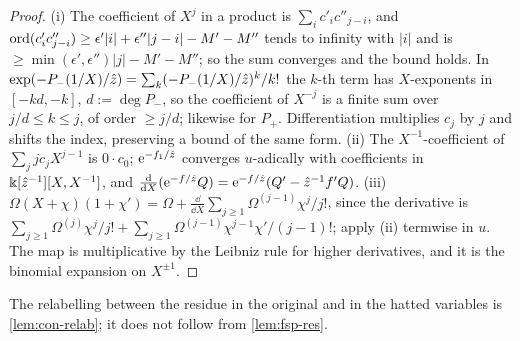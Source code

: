 \begin{proof}
(i) The coefficient of $X^j$ in a product is $\sum_ic'_ic''_{j-i}$, and $\operatorname{ord}(c'_ic''_{j-i})\geq\epsilon'|i|+\epsilon''|j-i|-M'-M''$ tends to infinity with $|i|$ and is $\geq\min(\epsilon',\epsilon'')|j|-M'-M''$; so the sum converges and the bound holds. In $\exp(-P_-(1/X)/\hat{z})=\sum_k(-P_-(1/X)/\hat{z})^k/k!$ the $k$-th term has $X$-exponents in $[-kd,-k]$, $d:=\deg P_-$, so the coefficient of $X^{-j}$ is a finite sum over $j/d\leq k\leq j$, of order $\geq j/d$; likewise for $P_+$. Differentiation multiplies $c_j$ by $j$ and shifts the index, preserving a bound of the same form. (ii) The $X^{-1}$-coefficient of $\sum_jjc_jX^{j-1}$ is $0\cdot c_0$; $\mathrm{e}^{-f_1/\hat{z}}$ converges $u$-adically with coefficients in $\Bbbk[\hat{z}^{-1}][X,X^{-1}]$, and $\frac{\mathrm{d}}{\mathrm{d} X}(\mathrm{e}^{-f/\hat{z}}Q)=\mathrm{e}^{-f/\hat{z}}(Q'-\hat{z}^{-1}f'Q)$. (iii) $\Omega(X+\chi)(1+\chi')=\Omega+\frac{\dd}{\dd X}\sum_{j\geq1}\Omega^{(j-1)}\chi^j/j!$, since the derivative is $\sum_{j\geq1}\Omega^{(j)}\chi^j/j!+\sum_{j\geq1}\Omega^{(j-1)}\chi^{j-1}\chi'/(j-1)!$; apply (ii) termwise in $u$. The map is multiplicative by the Leibniz rule for higher derivatives, and it is the binomial expansion on $X^{\pm1}$.
\end{proof}

The relabelling between the residue in the original and in the hatted variables is \cref{lem:con-relab}; it does not follow from \cref{lem:fsp-res}.

